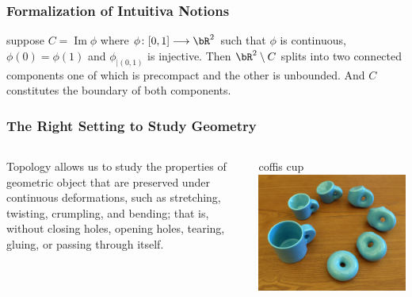 \documentclass{beamer}
\begin{document}
\begin{frame}
    \frametitle{Formalization of Intuitiva Notions}

    \begin{theorem}
        suppose $C=\operatorname{Im} \phi$ where $\phi\colon [0, 1]\longrightarrow \bR^2$ such that $\phi$ is \alert{continuous}, 
        $\phi(0) = \phi(1)$ and $\phi_{|(0, 1)}$ is injective. Then $\bR^2\setminus C$ splits into two \alert{connected components}
        one of which is \alert{precompact} and the other is unbounded. And $C$ constitutes the \alert{boundary} of both components.
    \end{theorem}

\end{frame}


\begin{frame}
    \frametitle{The Right Setting to Study Geometry}

    \begin{columns}
        \begin{column}{0.5\textwidth}
            Topology allows us to study the properties of geometric object that are preserved under continuous deformations, such as stretching, 
            twisting, crumpling, and bending; that is, without closing holes, opening holes, tearing, gluing, or passing through itself. 
        \end{column}
        \begin{column}{0.5\textwidth}
            \begin{block}{coffis cup}
                \href{https://upload.wikimedia.org/wikipedia/commons/2/26/Mug_and_Torus_morph.gif}{\includegraphics[width=\textwidth]{assets/mug_torus.jpg}}
            \end{block}
        \end{column}
    \end{columns}

\end{frame}
\end{document}
